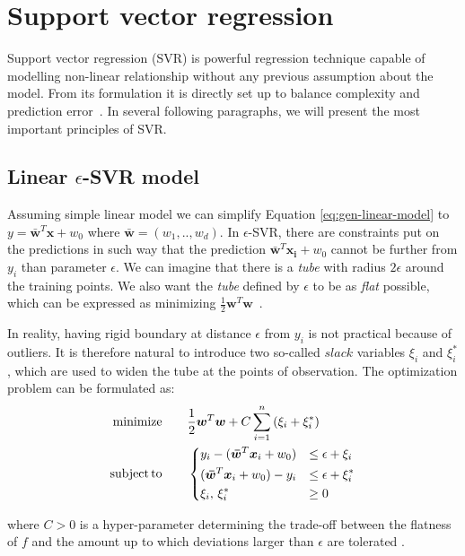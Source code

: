 \section{Support vector regression}
Support vector regression (SVR) is powerful regression technique capable of modelling non-linear relationship without any previous assumption about the model. From its formulation it is directly set up to balance complexity and prediction error~\cite{zhang2020}. In several following paragraphs, we will present the most important principles of SVR.

\subsection*{Linear $\epsilon$-SVR model}
Assuming simple linear model we can simplify Equation \ref{eq:gen-linear-model} to $y = \bm{\bar{w}}^T\bm{x} + w_0$ where $\bm{\bar{w}} = (w_1,..,w_d)$. In $\epsilon$-SVR, there are constraints put on the predictions in such way that the prediction $ \bm{\bar{w}}^T\bm{x_i} + w_0$ cannot be further from $y_i$ than parameter $\epsilon$. We can imagine that there is a \textit{tube} with radius $2\epsilon$ around the training points. We also want the \textit{tube} defined by $\epsilon$ to be as \textit{flat} possible, which can be expressed as minimizing $\frac{1}{2} \bm{w}^T\bm{w}$~\cite{zhang2020}.

In reality, having rigid boundary at distance $\epsilon$ from $y_i$ is not practical because of outliers. It is therefore natural to introduce two so-called $slack$ variables $\xi_i$ and $\xi_i^*$, which are used to widen the tube at the points of observation. The optimization problem can be formulated as:
\begin{align}
	\label{eq:svr1}
	\mathrm{minimize}\qquad & \frac{1}{2}\bm{w}^T\bm{w} + C\sum_{i=1}^{n}\left(\xi_i+\xi_i^*\right)  \\
	\mathrm{subject}\,\mathrm{to}\qquad & 
	\begin{dcases} 
		\label{eq:svr2}
		y_i - (\bm{\bar{w}}^T\bm{x}_i + w_0) 	& \leq \epsilon + \xi_i \\ 
		(\bm{\bar{w}}^T\bm{x}_i + w_0) - y_i  & \leq \epsilon + \xi_i^* \\
		           \xi_i,\,\xi_i^*   		& \geq 0 
	\end{dcases}
\end{align}

where $C>0$ is a hyper-parameter determining the trade-off between the flatness of $f$ and the amount up to which deviations larger than
$\epsilon$ are tolerated \cite{smola2004}.

